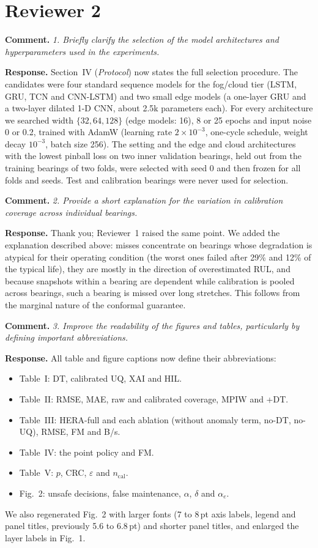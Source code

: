 \documentclass[11pt]{article}
\newcommand{\rc}[1]{\par\medskip\textbf{Comment.} \emph{#1}\par}
\newcommand{\rs}{\textbf{Response.} }
\begin{document}
\section*{Reviewer 2}

\rc{1. Briefly clarify the selection of the model architectures and hyperparameters used in the experiments.}

\rs Section~IV (\emph{Protocol}) now states the full selection procedure. The candidates were four standard sequence models for the fog/cloud tier (LSTM, GRU, TCN and CNN-LSTM) and two small edge models (a one-layer GRU and a two-layer dilated 1-D CNN, about 2.5k parameters each). For every architecture we searched width $\{32, 64, 128\}$ (edge models: 16), 8 or 25 epochs and input noise 0 or 0.2, trained with AdamW (learning rate $2\times10^{-3}$, one-cycle schedule, weight decay $10^{-3}$, batch size 256). The setting and the edge and cloud architectures with the lowest pinball loss on two inner validation bearings, held out from the training bearings of two folds, were selected with seed 0 and then frozen for all folds and seeds. Test and calibration bearings were never used for selection.

\rc{2. Provide a short explanation for the variation in calibration coverage across individual bearings.}

\rs Thank you; Reviewer~1 raised the same point. We added the explanation described above: misses concentrate on bearings whose degradation is atypical for their operating condition (the worst ones failed after 29\% and 12\% of the typical life), they are mostly in the direction of overestimated RUL, and because snapshots within a bearing are dependent while calibration is pooled across bearings, such a bearing is missed over long stretches. This follows from the marginal nature of the conformal guarantee.

\rc{3. Improve the readability of the figures and tables, particularly by defining important abbreviations.}

\rs All table and figure captions now define their abbreviations:
\begin{itemize}[leftmargin=*,itemsep=1pt]
\item Table~I: DT, calibrated UQ, XAI and HIL.
\item Table~II: RMSE, MAE, raw and calibrated coverage, MPIW and +DT.
\item Table~III: HERA-full and each ablation (without anomaly term, no-DT, no-UQ), RMSE, FM and B/s.
\item Table~IV: the point policy and FM.
\item Table~V: $p$, CRC, $\varepsilon$ and $n_{\mathrm{cal}}$.
\item Fig.~2: unsafe decisions, false maintenance, $\alpha$, $\delta$ and $\alpha_e$.
\end{itemize}
We also regenerated Fig.~2 with larger fonts (7 to 8\,pt axis labels, legend and panel titles, previously 5.6 to 6.8\,pt) and shorter panel titles, and enlarged the layer labels in Fig.~1.
\end{document}
